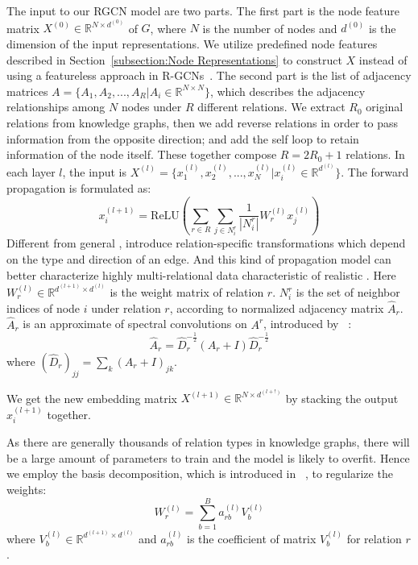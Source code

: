 	The input to our RGCN model are two parts. The first part is the node feature matrix $X^{(0)} \in \mathbb{R}^{N \times d^{(0)}}$ of $G$, where $N$ is the number of nodes and $d^{(0)}$ is the dimension of the input representations. We utilize predefined node features described in Section~\ref{subsection:Node Representations} to construct $X$ instead of using a featureless approach in R-GCNs~\cite{Schlichtkrull2017Modeling}.
	The second part is the list of adjacency matrices $A=\{A_1,A_2,...,A_R |A_i \in \mathbb{R}^{N \times N} \}$, which describes the adjacency relationships among $N$ nodes under $R$ different relations. We extract $R_0$ original relations from knowledge graphs, then we add reverse relations in order to pass information from the opposite direction; and add the self loop to retain information of the node itself. These together compose $R=2R_0+1$ relations.
	In each layer $l$, the input is $X^{(l)} = \{x^{(l)}_1,x^{(l)}_2,...,x^{(l)}_{N} |x^{(l)}_{i} \in \mathbb{R}^{d^{(l)}}\}$. The forward propagation is formulated as:
	\begin{equation}
	x_i^{(l+1)}=\mathrm{ReLU} (\sum\limits_{r \in R}\sum\limits_{j \in N_i^r}\frac{1}{|N_i^r|}W_r^{(l)}x_j^{(l)})
	\end{equation}
	Different from general \GCNs, \RGCNs introduce relation-specific transformations which depend on the type and direction of an edge. And this kind of propagation model can better characterize highly multi-relational data characteristic of realistic \KGs. Here $W_r^{(l)} \in \mathbb{R}^{d^{(l+1)} \times d^{(l)}}$ is the weight matrix of relation $r$. $N_i^r$ is the set of neighbor indices of node $i$ under relation $r$, according to normalized adjacency matrix $\hat A_r$. $\hat A_r$ is an approximate of spectral convolutions on $A^r$, introduced by ~\cite{Kipf2016Semi}:
	\begin{equation}
	\hat A_r=\hat D_r^{- \frac{1}{2}}(A_r+I)\hat D_r^{- \frac{1}{2}}
	\end{equation}
	where $(\hat D_r)_{jj}=\sum_k(A_r+I)_{jk}$.
	
	We get the new embedding matrix $X^{(l+1)} \in \mathbb{R}^{N \times d^{(l+!)}}$ by stacking the output $x_i^{(l+1)}$ together.
	
	As there are generally thousands of relation types in knowledge graphs, there will be a large amount of parameters to train and the model is likely to overfit. Hence we employ the basis decomposition, which is introduced in ~\cite{Schlichtkrull2017Modeling}, to regularize the weights:
	\begin{equation}
	W_r^{(l)}=\sum\limits_{b=1}^B a_{rb}^{(l)}V_b^{(l)}
	\end{equation}
	where $V_b^{(l)} \in \mathbb{R}^{d^{(l+1)} \times d^{(l)}}$ and $a_{rb}^{(l)}$ is the coefficient of matrix $V_b^{(l)}$ for relation $r$.
	
